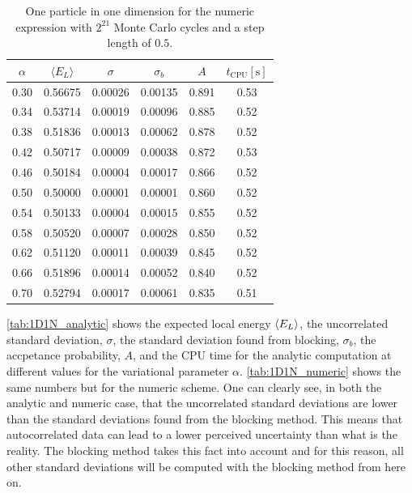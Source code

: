 \documentclass[
    a4paper, aps, twocolumn, floatfix, superscriptaddress,
    nofootinbib]{revtex4-1}
\newcommand{\1}{\mathds{1}}
\begin{document}
        \begin{table}
            \centering
            \caption{One particle in one dimension for the numeric expression
            with $2^{21}$ Monte Carlo cycles and a step length of $0.5$.}
            \begin{ruledtabular}
                \begin{tabular}{cccccc}
                    $\alpha$ & $\langle  E_L\rangle$ & $\sigma$ & $\sigma_b$
                    & $A$&$t_{\text{CPU}} [\si{\second}]$ \\
                    \hline
                    0.30&0.56675&0.00026&0.00135&0.891&0.53\\
                    0.34&0.53714&0.00019&0.00096&0.885&0.52\\
                    0.38&0.51836&0.00013&0.00062&0.878&0.52\\
                    0.42&0.50717&0.00009&0.00038&0.872&0.53\\
                    0.46&0.50184&0.00004&0.00017&0.866&0.52\\
                    0.50&0.50000&0.00001&0.00001&0.860&0.52\\
                    0.54&0.50133&0.00004&0.00015&0.855&0.52\\
                    0.58&0.50520&0.00007&0.00028&0.850&0.52\\
                    0.62&0.51120&0.00011&0.00039&0.845&0.52\\
                    0.66&0.51896&0.00014&0.00052&0.840&0.52\\
                    0.70&0.52794&0.00017&0.00061&0.835&0.51\\
                \end{tabular}
            \end{ruledtabular}
            \label{tab:1D1N_numeric}
        \end{table}

        \autoref{tab:1D1N_analytic} shows the expected local energy
        $\expval{E_L}$, the uncorrelated standard deviation, $\sigma$, the
        standard deviation found from blocking, $\sigma_b$, the accpetance
        probability, $A$, and the CPU time for the analytic computation at
        different values for the variational parameter $\alpha$.
        \autoref{tab:1D1N_numeric} shows the same numbers but for the numeric
        scheme.  One can clearly see, in both the analytic and numeric case,
        that the uncorrelated standard deviations are lower than the standard
        deviations found from the blocking method. This means that
        autocorrelated data can lead to a lower perceived uncertainty than what
        is the reality. The blocking method takes this fact into account and for
        this reason, all other standard deviations will be computed with the
        blocking method from here on.
\end{document}
